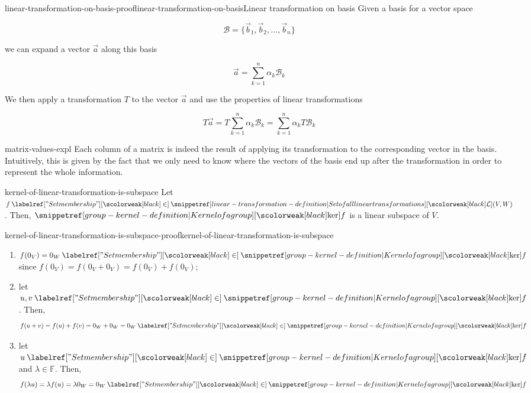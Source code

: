 \documentclass[preview]{standalone}
\begin{document}
\begin{snippetproof}{linear-transformation-on-basis-proof}{linear-transformation-on-basis}{Linear transformation on basis}
    Given a basis for a vector space

    \[
        \mathcal{B}=\{\vec{b}_1, \vec{b}_2, \ldots, \vec{b}_n\}
    \]
    
    we can expand a vector \(\vec{a}\) along this basis
    
    \[
        \vec{a} = \sum_{k=1}^{n} \alpha_k \mathcal{B}_k
    \]
    
    We then apply a transformation \(T\) to the vector \(\vec{a}\) and use the properties of
    linear transformations
    
    \[
        T\vec{a}
        = T\sum_{k=1}^{n} \alpha_k \mathcal{B}_k
        = \sum_{k=1}^{n} \alpha_k T\mathcal{B}_k
    \]
\end{snippetproof}

\begin{snippet}{matrix-values-expl}
    Each column of a matrix is indeed the result of applying its transformation
    to the corresponding vector in the basis.
    Intuitively, this is given by the fact that we only need to know where the vectors of the basis
    end up after the transformation in order to represent the whole information.
\end{snippet}

\begin{snippetproposition}{kernel-of-linear-transformation-is-subspace}{}
    Let \(f \in \setoflineartransformations(V, W)\). Then, \(\grpker f\) is a linear subspace of \(V\).
\end{snippetproposition}

\begin{snippetproof}{kernel-of-linear-transformation-is-subspace-proof}{kernel-of-linear-transformation-is-subspace}{}
    \begin{enumerate}
        \item \(f(0_V) = 0_W \in \grpker f\) since \(f(0_V) = f(0_V + 0_V) = f(0_V) +f(0_V)\);
        \item let \(u,v \in \grpker f\). Then,
        \[
            f(u+v) = f(u) + f(v) = 0_W + 0_W = 0_W \in \grpker f
        \]
        \item let \(u \in \grpker f\) and \(\lambda \in \mathbb{F}\). Then,
        \[
            f(\lambda u) = \lambda f(u) = \lambda 0_W = 0_W \in \grpker f
        \]
    \end{enumerate}
\end{snippetproof}
\end{document}
